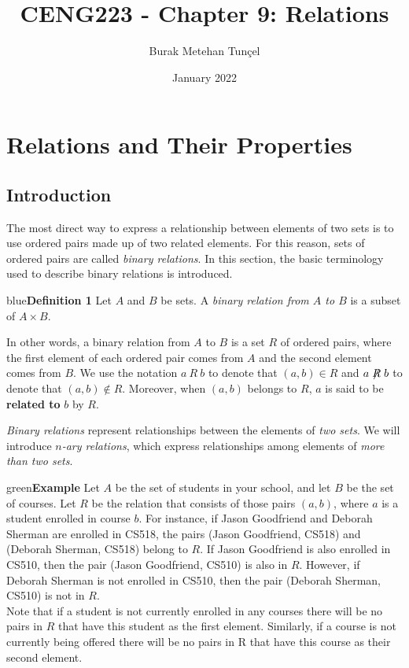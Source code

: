 \documentclass[11pt]{article}
\title{CENG223 - Chapter 9: Relations}
\author{Burak Metehan Tunçel}
\date{January 2022}
\newenvironment{example}[1][\unskip]{\begin{mybox}{green}{\textbf{Example} {#1}}}{\end{mybox}}
\newenvironment{definition}[1]{\begin{mybox}{blue}{\textbf{Definition #1}}}{\end{mybox}}
\begin{document}
\maketitle

\section{Relations and Their Properties}

\subsection{Introduction}
The most direct way to express a relationship between elements of two sets is to use ordered pairs made up of two related elements. For this reason, sets of ordered pairs are called \textit{binary relations}. In this section, the basic terminology used to describe binary relations is introduced.

\begin{definition}{1}
Let $A$ and $B$ be sets. A \textit{binary relation from $A$ to $B$} is a subset of $A \times B$.
\end{definition}

In other words, a binary relation from $A$ to $B$ is a set $R$ of ordered pairs, where the first element of each ordered pair comes from $A$ and the second element comes from $B$. We use the notation $a\ R\ b$ to denote that $(a, b) \in R$ and $a \centernot{R} b$ to denote that $(a, b) \notin R$. Moreover, when $(a, b)$ belongs to $R$, $a$ is said to be \textbf{related to} $b$ by $R$.

\textit{Binary relations} represent relationships between the elements of \textit{two sets}. We will introduce \textit{$n$-ary relations}, which express relationships among elements of \textit{more than two sets}.


\begin{example}
Let $A$ be the set of students in your school, and let $B$ be the set of courses. Let $R$ be the relation that consists of those pairs $(a, b)$, where $a$ is a student enrolled in course $b$. For instance, if Jason Goodfriend and Deborah Sherman are enrolled in CS518, the pairs (Jason Goodfriend, CS518) and (Deborah Sherman, CS518) belong to $R$. If Jason Goodfriend is also enrolled in CS510, then the pair (Jason Goodfriend, CS510) is also in $R$. However, if Deborah Sherman is not enrolled in CS510, then the pair (Deborah Sherman, CS510) is not in $R$.\\

Note that if a student is not currently enrolled in any courses there will be no pairs in $R$ that have this student as the first element. Similarly, if a course is not currently being offered there will be no pairs in R that have this course as their second element.
\end{example}
\end{document}
